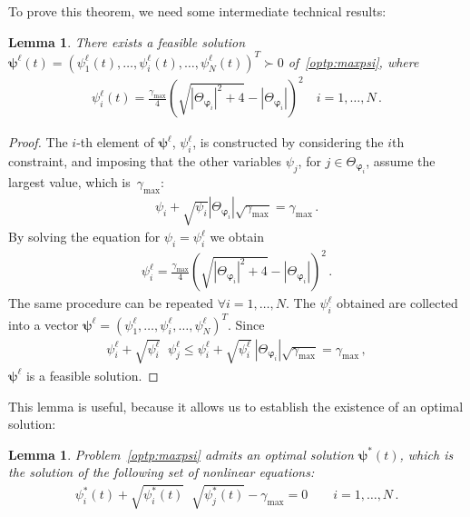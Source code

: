\documentclass[a4paper,notitlepage,onecolumn]{article}
\def\psib{\boldsymbol{\psi}}
\def\varphib{\boldsymbol{\varphi}}
\newtheorem{lemma}[theorem]{Lemma}
\numberwithin{equation}{section}
\begin{document}
To prove this theorem, we need some intermediate technical results:

\begin{lemma}
\label{lemma:psi-bound}
There exists a feasible solution $\psib^\ell(t) =(\psi_1^\ell(t), \ldots, \psi_i^\ell(t), \ldots,
\psi_N^\ell(t))^T \succ 0$ of~\eqref{optp:maxpsi}, where
\begin{align}
    \label{eq:ai} \psi_i^\ell(t)=\frac{\gamma_{\max}}{4}\left( \sqrt{|\Theta_{\varphib_i}|^2 + 4} - |\Theta_{\varphib_i}| \right)^2 \quad i=1,\dots,N \,.
\end{align}
\end{lemma}
\begin{proof}
The $i$-th element of $\psib^\ell$, $\psi_i^\ell$, is constructed by considering the $i$th constraint, and imposing that the other variables $\psi_j$, for $j\in \Theta_{\varphib_i}$, assume
the largest value, which is~$\gamma_{\max}$:
\begin{align*}
    \psi_i +  \sqrt{\psi_i} |\Theta_{\varphib_i}|\sqrt{\gamma_{\max}} = \gamma_{\max} \,.
\end{align*}
By solving the equation for $\psi_i=\psi_i^\ell$ we obtain
\begin{align}
     \psi_i^\ell=\frac{\gamma_{\max}}{4}\left( \sqrt{|\Theta_{\varphib_i}|^2 + 4} - |\Theta_{\varphib_i}| \right)^2 \,.
\end{align}
The same procedure can be repeated $\forall i=1,\ldots,N$. The $\psi_i^\ell$ obtained are collected into a vector $\psib^\ell =(\psi_1^\ell, \ldots, \psi_i^\ell, \ldots,
\psi_N^\ell)^T$. Since
\begin{align*}
    \psi_i^\ell +  \sqrt{\psi_i^\ell} \mathop{\sum_{j\in
    \Theta_{\varphib_i}}} \psi_j^\ell \leq \psi_i^\ell +  \sqrt{\psi_i^\ell}\:|\Theta_{\varphib_i}|\sqrt{\gamma_{\max}} = \gamma_{\max} \,,
\end{align*}
$\psib^\ell$ is a feasible solution.
\end{proof}
This lemma is useful, because it allows us to establish the
existence of an optimal solution:
\begin{lemma} \label{theo:OPsolutions}
Problem~\eqref{optp:maxpsi} admits an optimal solution $\psib^*(t)$, which is the solution of the following set of nonlinear equations:
\begin{align*}
    \psi_i^*(t) +  \sqrt{\psi_i^*(t)} \mathop{\sum_{j\in
    \Theta_{\varphib_i}}} \sqrt{\psi_j^*(t)} - \gamma_{\max} = 0 \qquad i=1,\dots,N \,.
\end{align*}
\end{lemma}
\end{document}
